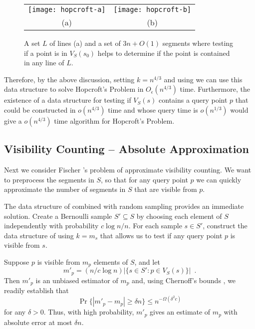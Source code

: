 \documentclass{patmorin}
\newcommand{\Oe}{O_\epsilon}
\begin{document}
\begin{figure}
  \begin{center}
    \begin{tabular}{cc}
      \texttt{[image: hopcroft-a]} &
      \texttt{[image: hopcroft-b]} \\
      (a) & (b)
    \end{tabular}
  \end{center}
  \caption{A set $L$ of lines (a) and a set of $3n+O(1)$ segments where
           testing if a point is in $V_S(s_0)$ helps to determine if
           the point is contained in any line of $L$.}
\end{figure}

Therefore, by the above discussion, setting $k=n^{4/3}$ and using
 we can use this data structure to solve Hopcroft's
Problem in $\Oe(n^{4/3})$ time.  Furthermore, the existence of a data
structure for testing if $V_S(s)$ contains a query point $p$ that could be
constructed in $o(n^{4/3})$ time and whose query time is $o(n^{1/3})$ would
give a $o(n^{4/3})$ time algorithm for Hopcroft's Problem.

\subsection{Visibility Counting -- Absolute Approximation}

Next we consider Fischer \etal's problem of approximate visibility
counting.  We want to preprocess the segments in $S$, so that for any
query point $p$ we can quickly approximate the number of segments in $S$
that are visible from $p$.

The data structure of  combined with random sampling
provides an immediate solution.  Create a Bernoulli sample $S'\subseteq
S$ by choosing each element of $S$ independently with probability
$c\log n/n$.  For each sample $s\in S'$, construct the data structure of
 using $k=m_s$ that allows us to test if any query
point $p$ is visible from $s$.

Suppose $p$ is visible from $m_p$ elements of $S$, and let 
\[
   m'_p= (n/c\log n)|\{s\in S': p\in V_S(s)\}| \enspace .
\]
Then $m'_p$ is an unbiased estimator of $m_p$ and, using Chernoff's bounds
\cite[Appendix~A.1]{as08}, we readily establish that
\[
   \Pr\{|m'_p - m_p| \ge \delta n\} \le n^{-\Omega(\delta^2 c)}
\]
for any $\delta > 0$.  Thus, with high probability, $m'_p$ gives an
estimate of $m_p$ with absolute error at most $\delta n$.
\end{document}
